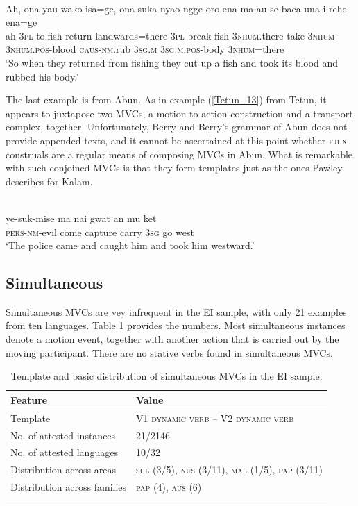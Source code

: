\ea \label{Tidore_87}
\\
\gll Ah, ona yau wako isa=ge, ona suka nyao ngge oro ena ma-au se-baca una i-rehe ena=ge \\
ah 3\textsc{pl} to.fish return landwards=there 3\textsc{pl} break fish 3\textsc{nhum}.there take 3\textsc{nhum} 3\textsc{nhum}.\textsc{pos}-blood \textsc{caus}-\textsc{nm}.rub 3\textsc{sg}.\textsc{m} 3\textsc{sg}.\textsc{m}.\textsc{pos}-body 3\textsc{nhum}=there \\
\glft ‘So when they returned from fishing they cut up a fish and took its blood and rubbed his body.’\\ 
\z

The last example is from Abun. As in example (\ref{Tetun_13}) from Tetun, it appears to juxtapose two MVCs, a motion-to-action construction and a transport complex, together. Unfortunately, Berry and Berry's grammar of Abun does not provide appended texts, and it cannot be ascertained at this point whether \textsc{fjux} construals are a regular means of composing MVCs in Abun. What is remarkable with such conjoined MVCs is that they form templates just as the ones Pawley describes for Kalam.

\ea \label{Abun_4}
\\
\gll ye-suk-mise ma nai gwat an mu ket \\
\textsc{pers}-\textsc{nm}-evil come capture carry 3\textsc{sg} go west \\
\glft `The police came and caught him and took him westward.'\\ 
\z

\subsection{Simultaneous} \label{sec:simultaneous}

Simultaneous \textsc{MVC}s are vey infrequent in the EI sample, with only 21 examples from ten languages. Table \ref{table:simultaneous} provides the numbers. Most simultaneous instances denote a motion event, together with another action that is carried out by the moving participant. There are no stative verbs found in simultaneous MVCs.

\begin{table}
\begin{tabular}{ll}
\lsptoprule
Feature&Value\tabularnewline
\hline
Template& V1 \textsc{dynamic verb} -- V2 \textsc{dynamic verb}\tabularnewline
No. of attested instances& 21/2146 \tabularnewline
No. of attested languages& 10/32 \tabularnewline
Distribution across areas& \textsc{sul} (3/5), \textsc{nus} (3/11), \textsc{mal} (1/5), \textsc{pap} (3/11) \tabularnewline
Distribution across families& \textsc{pap} (4), \textsc{aus} (6) \tabularnewline
\lspbottomrule
\end{tabular}
\caption[Template and basic distribution of simultaneous MVCs]{Template and basic distribution of simultaneous MVCs in the EI sample.}
\label{table:simultaneous}
\end{table}

